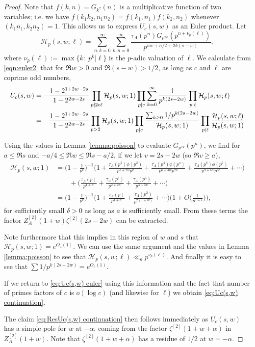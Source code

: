 \documentclass[10pt,a4paper]{amsart}
\begin{document}
	\begin{proof}
		Note that $f(k,n)=G_{k^2}(n)$ is a multiplicative function of two variables; i.e. we have $f(k_1k_2,n_1n_2)=f(k_1,n_1)f(k_2,n_2)$ whenever $(k_1n_1,k_2n_2)=1$. 
		This allows us to express $U_c(s,w)$ as an Euler product. Let
		$$
		\mathcal{H}_p(s,w;\ell) = \sum_{n,k=0}^\infty \sum_{k,n=0}^\infty \frac{\tau_A(p^n)G_{p^{2k}}(p^{n+\nu_p(\ell)})}{p^{nw+n/2+2k (s-w)}},
		$$
		where $\nu_p(\ell) := \max \{k:\; p^k | \ell\}$ is the $p$-adic valuation of $\ell$. We calculate from \eqref{eqn:euler2} that for $\Re w > 0$ and $\Re(s-w) > 1/2$, as long as $c$ and $\ell$ are coprime odd numbers,
		\begin{align}
			\label{eq:Uc(s,w) euler}
			\notag U_c(s,w) &= -\frac{1-2^{1+2w-2s}}{1-2^{2w-2s}} \prod_{p \nmid 2c\ell} \mathcal{H}_p(s,w;1) \prod_{p | c} \sum_{k=0}^\infty \frac{1}{p^{k(2s-2w)}} \prod_{p | \ell} \mathcal{H}_p(s,w;\ell) \\
			&= -\frac{1-2^{1+2w-2s}}{1-2^{2w-2s}}  \prod_{p>2} \mathcal{H}_p(s,w;1) \prod_{\substack{p|c}} \frac{ \sum_{k\geq 0} 1/p^{k(2s-2w)}}{\mathcal{H}_p(s,w;1) } \prod_{p | \ell} \frac{\mathcal{H}_p(s,w;\ell)}{\mathcal{H}_p(s,w;1)}
		\end{align}
		
		Using the values in Lemma \ref{lemma:poisson} to evaluate $G_{p^{2k}}(p^n)$, we find for $a \leq \Re s $ and $-a/4 \leq \Re w \leq \Re s - a/2$, if we let $v = 2s-2w$ (so $\Re v \geq a$),
		\begin{align*}
			\mathcal{H}_p(s,w;1) &=\Big(1 - \frac{1}{p^v}\Big)^{-1} \Big(1 + \frac{\tau_A(p^2) \phi(p^2)}{p^{3+2w} p^v} + \frac{\tau_A(p^4) \phi(p^4)}{p^{6+4w} p^{2v}} + \frac{\tau_A(p^6) \phi(p^6)}{p^{9+6w} p^{3v}}+\cdots \Big) \\
			&\quad\quad + \Big( \frac{\tau_A(p)}{p^{1+w}} + \frac{\tau_A(p^3)}{p^{2+2w}} + \frac{\tau_A(p^5)}{p^{3+5w}} +\cdots \Big)\\
			&= \Big(1 - \frac{1}{p^v}\Big)^{-1} \Big(1 + \frac{\tau_A(p)}{p^{1+w}} + \frac{\tau_A(p^2)}{p^{2(1+w)}}+\cdots\Big)\Big(1 + O\Big(\frac{1}{p^{1+\delta}}\Big)\Big),
		\end{align*}
		for sufficiently small $\delta > 0$ as long as $a$ is sufficiently small. From these terms the factor $Z^{[2]}_A(1+w) \zeta^{[2]}(2s-2w)$ can be extracted. 
		
		Note furthermore that this implies in this region of $w$ and $s$ that $\mathcal{H}_p(s,w;1) = e^{O_a(1)}$. We can use the same argument and the values in Lemma \ref{lemma:poisson} to see that $\mathcal{H}_p(s,w;\ell) \ll_a p^{\nu_p(\ell)}$. And finally it is easy to see that $\sum 1/p^{k(2s-2w)} = e^{O_a(1)}$. 
		
		If we return to \eqref{eq:Uc(s,w) euler} using this information and the fact that number of primes factors of $c$ is $o(\log c)$ (and likewise for $\ell$) we obtain \eqref{eq:Uc(s,w) continuation}.
		
		The claim \eqref{eq:ResUc(s,w) continuation} then follows immediately as $U_c(s,w)$ has a simple pole for $w$ at $-\alpha$, coming from the factor $\zeta^{[2]}(1+w+\alpha)$ in $Z^{[2]}_A(1+w)$. Note that $\zeta^{[2]}(1+w+\alpha)$ has a residue of $1/2$ at $w = -\alpha$.
	\end{proof}
\end{document}
